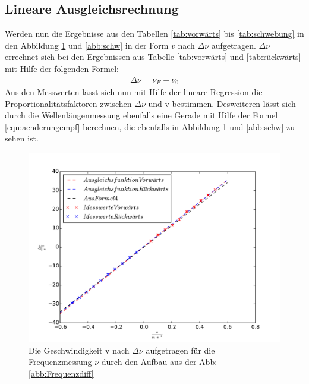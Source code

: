 \subsection{Lineare Ausgleichsrechnung}
Werden nun die Ergebnisse aus den Tabellen \ref{tab:vorwärts} bis \ref{tab:schwebung}
in den Abbildung \ref{abb:freq} und \ref{abb:schw} in der Form $v$ nach $\Delta\nu$ aufgetragen.
$\Delta\nu$ errechnet sich bei den Ergebnissen aus Tabelle \ref{tab:vorwärts} und \ref{tab:rückwärts}
mit Hilfe der folgenden Formel:
\begin{align}
\Delta\nu=\nu_E-\nu_0
\end{align}
Aus den Messwerten lässt sich nun mit Hilfe der lineare Regression
die Proportionalitätsfaktoren zwischen $\Delta\nu$ und v bestimmen.
Desweiteren lässt sich durch die Wellenlängenmessung ebenfalls eine Gerade mit Hilfe der Formel \eqref{eqn:aenderungempf}
berechnen, die ebenfalls in Abbildung \ref{abb:freq} und \ref{abb:schw} zu sehen ist.
\begin{figure}
\centering
\includegraphics[width=1\textwidth]{graph.pdf}
\caption{Die Geschwindigkeit v nach $\Delta\nu $ aufgetragen für die Frequenzmessung $\nu$ durch den Aufbau aus der Abb:\ref{abb:Frequenzdiff}}
\label{abb:freq}
\end{figure}
